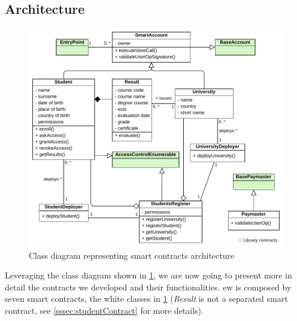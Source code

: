 \subsection{Architecture}
\begin{figure}
  \centering
  \includegraphics[width=1\textwidth]{figures/Contracts class diagram.pdf}
  \caption[Smart contracts architecture class diagram]{Class diagram representing smart contracts architecture}
  \label{fig:contractsClass}
\end{figure}

Leveraging the class diagram shown in \cref{fig:contractsClass}, we are now going to present more in detail the contracts we developed and their functionalities. \acrshort{ew} is composed by seven smart contracts, the white classes in \cref{fig:contractsClass} (\textit{Result} is not a separated smart contract, see \cref{sssec:studentContract} for more details). 

